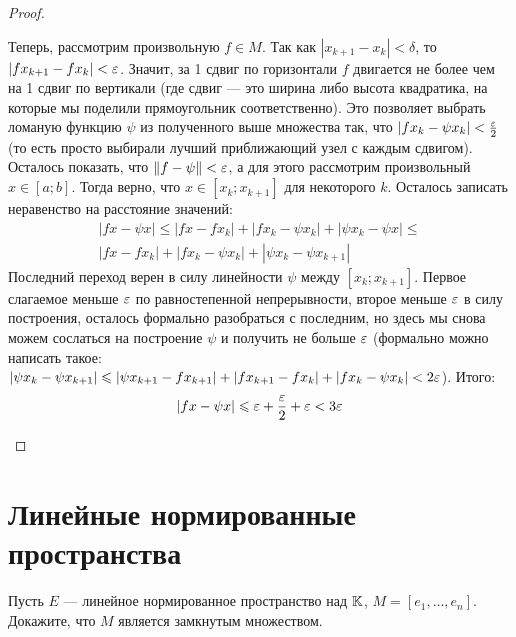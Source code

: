 \begin{proof}
\begin{itemize}
		Теперь, рассмотрим произвольную $f \in M$. Так как $|x_{k + 1} - x_k| < \delta$, то $|fx_{k + 1} - fx_k| < \varepsilon$. Значит, за 1 сдвиг по горизонтали $f$ двигается не более чем на 1 сдвиг по вертикали (где сдвиг --- это ширина либо высота квадратика, на которые мы поделили прямоугольник соответственно). Это позволяет выбрать ломаную функцию $\psi$ из полученного выше множества так, что $|fx_k - \psi x_k| < \frac{\varepsilon}{2}$ (то есть просто выбирали лучший приближающий узел с каждым сдвигом). Осталось показать, что $\|f - \psi\| < \varepsilon$, а для этого рассмотрим произвольный $x \in [a; b]$. Тогда верно, что $x \in [x_k; x_{k + 1}]$ для некоторого $k$. Осталось записать неравенство на расстояние значений:
		\begin{multline*}
			|fx - \psi x| \le |fx - fx_k| + |fx_k - \psi x_k| + |\psi x_k - \psi x| \le
			\\
			|fx - fx_k| + |fx_k - \psi x_k| + |\psi x_k - \psi x_{k + 1}|
		\end{multline*}
		Последний переход верен в силу линейности $\psi$ между $[x_k; x_{k + 1}]$. Первое слагаемое меньше $\varepsilon$ по равностепенной непрерывности, второе меньше $\varepsilon$ в силу построения, осталось формально разобраться с последним, но здесь мы снова можем сослаться на построение $\psi$ и получить не больше $\varepsilon$ (формально можно написать такое: $|\psi x_k - \psi x_{k + 1}| \leqslant |\psi x_{k + 1} - fx_{k + 1}| + |fx_{k + 1} - fx_k| + |fx_k - \psi x_k| < 2\varepsilon$). Итого:
		\[
			|fx - \psi x| \leqslant \varepsilon + \frac{\varepsilon}{2} + \varepsilon < 3\varepsilon
		\]
	\end{itemize}
\end{proof}

\section{Линейные нормированные пространства}

\begin{exercise}
	Пусть $E$ --- линейное нормированное пространство над $\mathbb{K}$, $M = [e_1, \ldots, e_n]$. Докажите, что $M$ является замкнутым множеством.
\end{exercise}